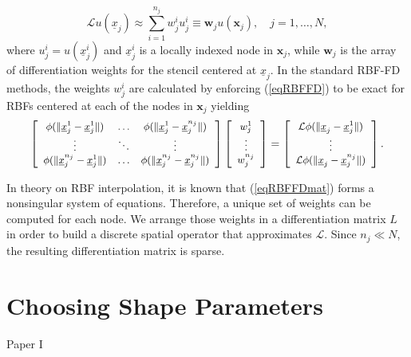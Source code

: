 \documentclass{UUThesisTemplate}
\begin{document}
\begin{equation}
\mathcal{L}u(\underline{x}_j)\approx\sum_{i=1}^{n_j}{w}_{j}^{i}u_j^{i}\equiv \mathbf{w}_ju(\mathbf{x}_j),\quad j=1,\ldots,N,
\label{eqRBFFD}
\end{equation}
where $u_j^{i}=u(\underline{x}_j^i)$ and $\underline{x}_j^i$ is a locally indexed node in $\mathbf{x}_j$, while $\mathbf{w}_j$ is the array of differentiation weights for the stencil centered at $\underline{x}_j$. In the standard RBF-FD methods, the weights ${w}_j^i$ are calculated by enforcing (\ref{eqRBFFD}) to be exact for RBFs centered at each of the nodes in $\mathbf{x}_j$ yielding
\begin{equation}
\label{eqRBFFDmat}
{\footnotesize{
\left[\begin{array}{cccc}
\phi(\|\underline{x}_j^{1}-\underline{x}_j^{1}\|) & \ldots & \phi(\|\underline{x}_j^{1}-\underline{x}_{j}^{n_j}\|)\\
\vdots & \ddots & \vdots\\
\phi(\|\underline{x}_{j}^{n_j}-\underline{x}_j^{1}\|) & \ldots & \phi(\|\underline{x}_{j}^{n_j}-\underline{x}_{j}^{n_j}\|)
\end{array}\right]
\left[\begin{array}{c}
{w}_j^{1}\\
\vdots\\
{w}_{j}^{n_j}
\end{array}\right]=
\left[\begin{array}{c}
\mathcal{L}\phi(\|\underline{x}_{j}-\underline{x}_j^{1}\|)\\
\vdots \\
\mathcal{L}\phi(\|\underline{x}_{j}-\underline{x}_{{j}}^{n_j}\|)
\end{array}\right].}}
\end{equation}

In theory on RBF interpolation, it is known that (\ref{eqRBFFDmat}) forms a nonsingular system of equations. Therefore, a unique set of weights can be computed for each node. We arrange those weights in a differentiation matrix $L$ in order to build a discrete spatial operator that approximates $\mathcal{L}$. Since $n_j \ll N$, the resulting differentiation matrix is sparse.
\section{Choosing Shape Parameters}
Paper I
%
\end{document}
